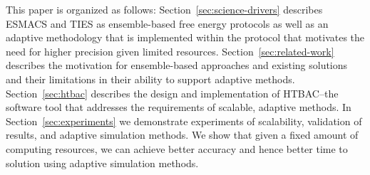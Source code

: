 This paper is organized as follows: 
Section~\ref{sec:science-drivers} describes ESMACS and TIES as ensemble-based 
free energy protocols as well as an adaptive methodology that is implemented 
within the protocol that motivates the need for higher precision given limited 
resources. 
Section~\ref{sec:related-work} describes the motivation for ensemble-based 
approaches and existing solutions and their limitations in their ability to 
support adaptive methods.  
Section~\ref{sec:htbac} describes the design and implementation of 
HTBAC--the software tool that addresses the requirements of scalable, 
adaptive methods. 
In Section~\ref{sec:experiments} we demonstrate experiments of scalability, 
validation of results, and adaptive simulation methods. We show that given a 
fixed amount of computing resources, we can achieve better accuracy and hence 
better time to solution using adaptive simulation methods. 





